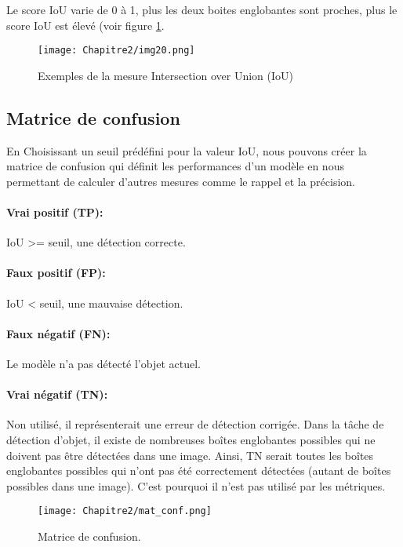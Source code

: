 Le score IoU varie de 0 à 1, plus les deux boites englobantes sont proches, plus le score IoU est élevé (voir figure \ref{img20}.
          \begin{figure}[H]
               \centering
               \texttt{[image: Chapitre2/img20.png]}
               \caption{Exemples de la mesure Intersection over Union (IoU)}
               \label{img20}
               \end{figure}

\subsection{Matrice de confusion}

En Choisissant un seuil prédéfini pour la valeur IoU, nous pouvons créer la matrice de confusion qui définit les performances d'un modèle en nous permettant de calculer d'autres mesures comme le rappel et la précision.
          \paragraph{Vrai positif (TP):} IoU >= seuil, une détection correcte. 
          \paragraph{Faux positif (FP):} IoU < seuil, une mauvaise détection.
          \paragraph{Faux négatif (FN):} Le modèle n'a pas détecté l'objet actuel.
          \paragraph{Vrai négatif (TN):} Non utilisé, il représenterait une erreur de détection corrigée. Dans la tâche de détection d'objet, il existe de nombreuses boîtes englobantes possibles qui ne doivent pas être détectées dans une image. Ainsi, TN serait toutes les boîtes englobantes possibles qui n'ont pas été correctement détectées (autant de boîtes possibles dans une image). C'est pourquoi il n'est pas utilisé par les métriques.
          \begin{figure}[H]
               \centering
               \texttt{[image: Chapitre2/mat\_conf.png]}
               \caption{Matrice de confusion.}
               \label{mat_conf}
               \end{figure}
          
